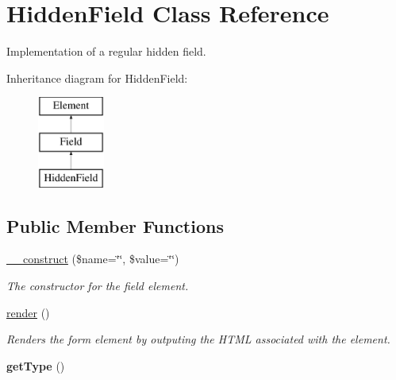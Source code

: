\hypertarget{class_hidden_field}{
\section{HiddenField Class Reference}
\label{class_hidden_field}
}


Implementation of a regular hidden field.  


Inheritance diagram for HiddenField:\begin{figure}[H]
\begin{center}
\leavevmode
\includegraphics[height=3.000000cm]{class_hidden_field}
\end{center}
\end{figure}
\subsection*{Public Member Functions}
\begin{DoxyCompactItemize}
\item 
\hypertarget{class_hidden_field_a3c899a0c3feb14449be14ce429b8e3cf}{
\hyperlink{class_hidden_field_a3c899a0c3feb14449be14ce429b8e3cf}{\_\-\_\-construct} (\$name=\char`\"{}\char`\"{}, \$value=\char`\"{}\char`\"{})}
\label{class_hidden_field_a3c899a0c3feb14449be14ce429b8e3cf}

\begin{DoxyCompactList}\small\item\em The constructor for the field element. \item\end{DoxyCompactList}\item 
\hyperlink{class_hidden_field_af6b94a1f2721c5b740bf4f0123487929}{render} ()
\begin{DoxyCompactList}\small\item\em Renders the form element by outputing the HTML associated with the element. \item\end{DoxyCompactList}\item 
\hypertarget{class_hidden_field_a1b7d4fed850eac31c37e4b8728607958}{
{\bfseries getType} ()}
\label{class_hidden_field_a1b7d4fed850eac31c37e4b8728607958}

\end{DoxyCompactItemize}


